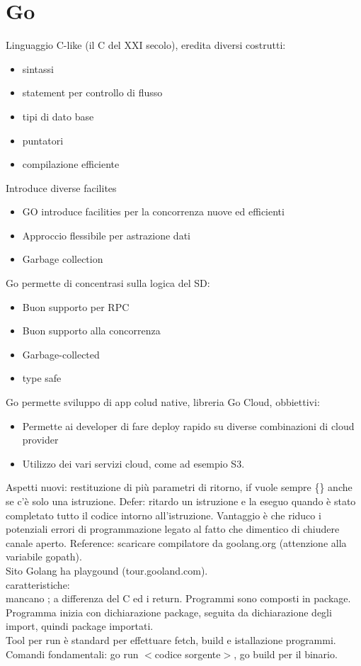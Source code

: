 \documentclass{article}
\begin{document}
\section{Go}
Linguaggio C-like (il C del XXI secolo), eredita diversi costrutti:
\begin{itemize}
\item sintassi
\item statement per controllo di flusso
\item tipi di dato base
\item puntatori
\item compilazione efficiente
\end{itemize}
Introduce diverse facilites
\begin{itemize}
\item GO introduce facilities per la concorrenza nuove ed efficienti
\item Approccio flessibile per astrazione dati
\item Garbage collection
\end{itemize}
Go permette di concentrasi sulla logica del SD:
\begin{itemize}
\item Buon supporto per RPC
\item Buon supporto alla concorrenza
\item Garbage-collected
\item type safe
\end{itemize}
Go permette sviluppo di app colud native, libreria Go Cloud, obbiettivi:
\begin{itemize}
\item Permette ai developer di fare deploy rapido su diverse combinazioni di cloud provider
\item Utilizzo dei vari servizi cloud, come ad esempio S3.
\end{itemize}
Aspetti nuovi: restituzione di più parametri di ritorno, if vuole sempre \{\} anche se c'è solo una istruzione. Defer: ritardo un istruzione e la eseguo quando è stato completato tutto il codice intorno all'istruzione. Vantaggio è che riduco i potenziali errori di programmazione legato al fatto che dimentico di chiudere canale aperto.
Reference: scaricare compilatore da goolang.org (attenzione alla variabile gopath).\\ Sito Golang ha playgound (tour.gooland.com).\\ caratteristiche:\\ mancano ; a differenza del C ed i return. Programmi sono composti in package. Programma inizia con dichiarazione package, seguita da dichiarazione degli import, quindi package importati.\\ Tool per run è standard per effettuare fetch, build e istallazione programmi.\\ Comandi fondamentali: go run $<$codice sorgente$>$, go build per il binario.
\end{document}
